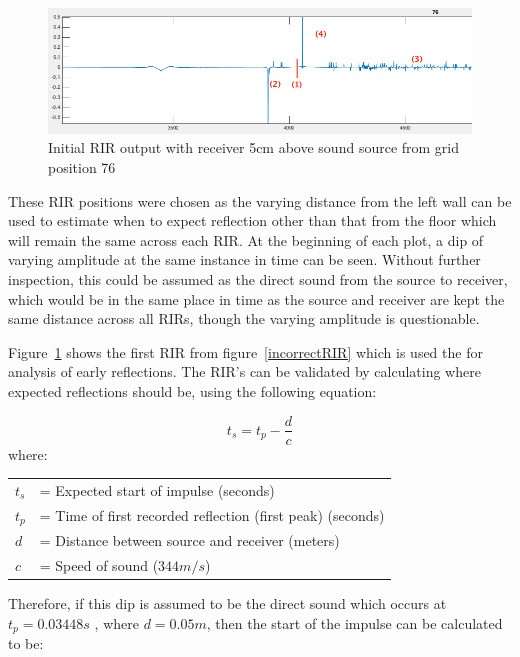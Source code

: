 \documentclass[../../main.tex]{subfiles}
\begin{document}
			\begin{figure}[H]
				\centerline{\includegraphics[scale = 0.5]{Sections/Implementation/Odeon/images/incorrectRIR/RIR_76_incorrect_edit_crop.png}}
				\caption{Initial \ac{RIR} output with receiver 5cm above sound source from grid position 76}
				\label{incorrectRIR_76}
			\end{figure}

			These \ac{RIR} positions were chosen as the varying distance from the left wall can be used to estimate when to expect reflection other than that from the floor which will remain the same across each \ac{RIR}. At the beginning of each plot, a dip of varying amplitude at the same instance in time can be seen. Without further inspection, this could be assumed as the direct sound from the source to receiver, which would be in the same place in time as the source and receiver are kept the same distance across all RIRs, though the varying amplitude is questionable.

			Figure~\ref{incorrectRIR_76} shows the first \ac{RIR} from figure~\ref{incorrectRIR} which is used the for analysis of early reflections. The \ac{RIR}'s can be validated by calculating where expected reflections should be, using the following equation:
			
			\begin{equation}\label{distance}
				t_s = t_p - \frac{d}{c}
			\end{equation}
			where:

			\begin{tabular}{l l}
			$t_s$ & = Expected start of impulse (seconds)\\
			$t_p$ & = Time of first recorded reflection (first peak) (seconds)\\
			$d$ & = Distance between source and receiver (meters)\\
			$c$ & = Speed of sound ($344m/s$) \\
			\end{tabular}


			Therefore, if this dip is assumed to be the direct sound which occurs at $t_p = 0.03448s$ , where $d = 0.05m$, then the start of the impulse can be calculated to be:
\end{document}
